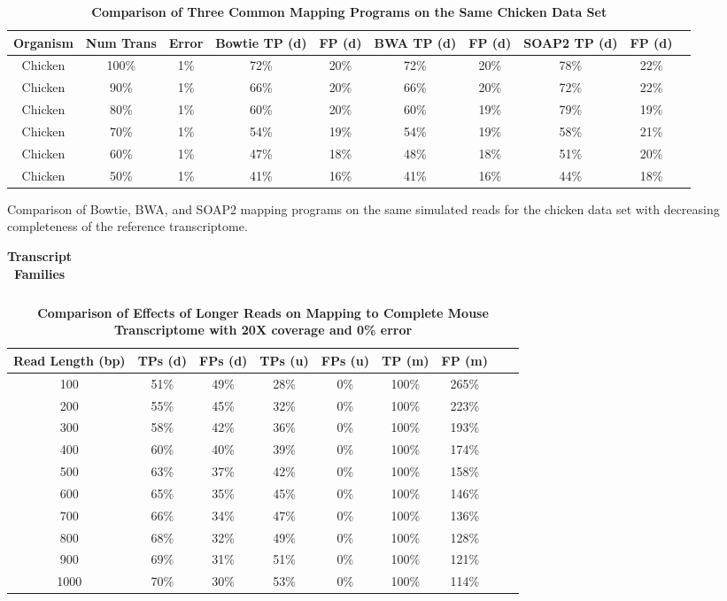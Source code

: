 \documentclass[10pt]{article}
\begin{document}
\begin{table}[!ht]
\caption{
\bf{Comparison of Three Common Mapping Programs on the Same Chicken Data Set }}
\begin{tabular}{|c|c|c||c|c||c|c||c|c||c|}
\hline
Organism & Num Trans & Error  & Bowtie TP (d) & FP (d) & BWA TP (d) & FP (d) & SOAP2 TP (d) & FP (d)\\
\hline
Chicken & 100\% & 1\% & 72\%& 20\%&72\%&20\%&78\%&22\%\\
Chicken & 90\% & 1\% & 66\%& 20\%&66\%&20\%&72\%&22\%\\
Chicken & 80\% & 1\% & 60\%& 20\%&60\%&19\%&79\%&19\%\\
Chicken & 70\% & 1\% & 54\%& 19\%&54\%&19\%&58\%&21\%\\
Chicken & 60\% & 1\% & 47\%& 18\%&48\%&18\%&51\%&20\%\\
Chicken & 50\% & 1\% & 41\%& 16\%&41\%&16\%&44\%&18\%\\
\hline
\end{tabular}
\begin{flushleft} Comparison of Bowtie, BWA, and SOAP2 mapping programs on the same simulated reads for the chicken data set with decreasing completeness of the reference transcriptome.
\end{flushleft}
\label{tab:mapperComp}
\end{table}

\begin{table}[!ht]
\caption{
\bf{Transcript Families }}
\begin{tabular}{|c|c|c||c|c||c|c||c|c||c|}
\hline
\hline
\hline
\end{tabular}
\begin{flushleft} 
\end{flushleft}
\label{tab:transcriptFamilies}
\end{table}

\begin{table}[!ht]
\caption{
\bf{Comparison of Effects of Longer Reads on Mapping to Complete Mouse Transcriptome with 20X coverage and 0\% error}}
\begin{tabular}{|c||c|c||c|c||c|c||c|c||}
\hline
Read Length (bp)& TPs (d) & FPs (d) & TPs (u) & FPs (u) & TP (m) & FP (m)\\
\hline
100 & 51\%&49\%& 28\%& 0\%& 100\%& 265\%\\
200 & 55\%&45\%& 32\%& 0\%& 100\%& 223\%\\
300 & 58\%&42\%& 36\%& 0\%& 100\%& 193\%\\
400 & 60\%&40\%& 39\%& 0\%& 100\%& 174\%\\
500 & 63\%&37\%& 42\%& 0\%& 100\%& 158\%\\
600 & 65\%&35\%& 45\%& 0\%& 100\%& 146\%\\
700 & 66\%&34\%& 47\%& 0\%& 100\%& 136\%\\
800 & 68\%&32\%& 49\%& 0\%& 100\%& 128\%\\
900 & 69\%&31\%& 51\%& 0\%& 100\%& 121\%\\
1000 & 70\%&30\%& 53\%& 0\%& 100\%& 114\%\\
\hline
\end{tabular}
\begin{flushleft} 
\end{flushleft}
\label{tab:longReads}
\end{table}
\end{document}
